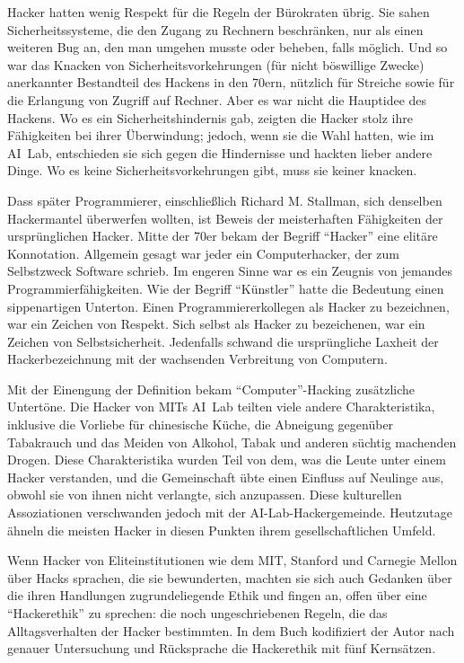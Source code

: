 Hacker hatten wenig Respekt für die Regeln der Bürokraten übrig. Sie sahen Sicherheitssysteme, die den Zugang zu Rechnern beschränken, nur als einen weiteren Bug an, den man umgehen musste oder beheben, falls möglich. Und so war das Knacken von Sicherheitsvorkehrungen (für nicht böswillige Zwecke) anerkannter Bestandteil des Hackens in den 70ern, nützlich für Streiche sowie für die Erlangung von Zugriff auf Rechner. Aber es war nicht die Hauptidee des Hackens. Wo es ein Sicherheitshindernis gab, zeigten die Hacker stolz ihre Fähigkeiten bei ihrer Überwindung; jedoch, wenn sie die Wahl hatten, wie im AI~Lab, entschieden sie sich gegen die Hindernisse und hackten lieber andere Dinge. Wo es keine Sicherheitsvorkehrungen gibt, muss sie keiner knacken.

Dass später Programmierer, einschließlich Richard M. Stallman, sich denselben Hackermantel überwerfen wollten, ist Beweis der meisterhaften Fähigkeiten der ursprünglichen Hacker. Mitte der 70er bekam der Begriff "`Hacker"' eine elitäre Konnotation. Allgemein gesagt war jeder ein Computerhacker, der zum Selbstzweck Software schrieb. Im engeren Sinne war es ein Zeugnis von jemandes Programmierfähigkeiten. Wie der Begriff "`Künstler"' hatte die Bedeutung einen sippenartigen Unterton. Einen Programmiererkollegen als Hacker zu bezeichnen, war ein Zeichen von Respekt. Sich selbst als Hacker zu bezeichenen, war ein Zeichen von Selbstsicherheit. Jedenfalls schwand die ursprüngliche Laxheit der Hackerbezeichnung mit der wachsenden Verbreitung von Computern.

Mit der Einengung der Definition bekam "`Computer"'-Hacking zusätzliche Untertöne. Die Hacker von MITs AI~Lab teilten viele andere Charakteristika, inklusive die Vorliebe für chinesische Küche, die Abneigung gegenüber Tabakrauch und das Meiden von Alkohol, Tabak und anderen süchtig machenden Drogen. Diese Charakteristika wurden Teil von dem, was die Leute unter einem Hacker verstanden, und die Gemeinschaft übte einen Einfluss auf Neulinge aus, obwohl sie von ihnen nicht verlangte, sich anzupassen. Diese kulturellen Assoziationen verschwanden jedoch mit der AI-Lab-Hackergemeinde. Heutzutage ähneln die meisten Hacker in diesen Punkten ihrem gesellschaftlichen Umfeld.

Wenn Hacker von Eliteinstitutionen wie dem MIT, Stanford und Carnegie Mellon über Hacks sprachen, die sie bewunderten, machten sie sich auch Gedanken über die ihren Handlungen zugrundeliegende Ethik und fingen an, offen über eine "`Hackerethik"' zu sprechen: die noch ungeschriebenen Regeln, die das Alltagsverhalten der Hacker bestimmten. In dem Buch  kodifiziert der Autor  nach genauer Untersuchung und Rücksprache die Hackerethik mit fünf Kernsätzen.


